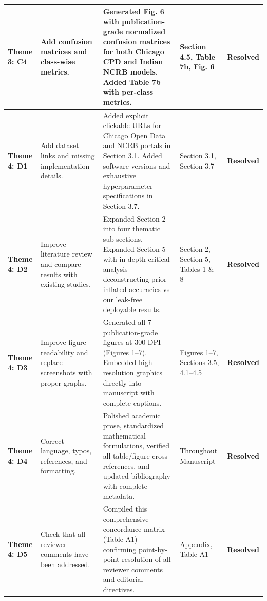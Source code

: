 \documentclass[runningheads]{llncs}
\begin{document}
\begin{table}[ht]
{\begin{tabular}{lp{4.5cm}p{5.5cm}p{3cm}c}
\textbf{Theme 3: C4} & Add confusion matrices and class-wise metrics. & Generated Fig. 6 with publication-grade normalized confusion matrices for both Chicago CPD and Indian NCRB models. Added Table 7b with per-class metrics. & Section 4.5, Table 7b, Fig. 6 & \textbf{Resolved} \\
\midrule
\textbf{Theme 4: D1} & Add dataset links and missing implementation details. & Added explicit clickable URLs for Chicago Open Data and NCRB portals in Section 3.1. Added software versions and exhaustive hyperparameter specifications in Section 3.7. & Section 3.1, Section 3.7 & \textbf{Resolved} \\
\textbf{Theme 4: D2} & Improve literature review and compare results with existing studies. & Expanded Section 2 into four thematic sub-sections. Expanded Section 5 with in-depth critical analysis deconstructing prior inflated accuracies vs our leak-free deployable results. & Section 2, Section 5, Tables 1 \& 8 & \textbf{Resolved} \\
\textbf{Theme 4: D3} & Improve figure readability and replace screenshots with proper graphs. & Generated all 7 publication-grade figures at 300 DPI (Figures 1--7). Embedded high-resolution graphics directly into manuscript with complete captions. & Figures 1--7, Sections 3.5, 4.1--4.5 & \textbf{Resolved} \\
\textbf{Theme 4: D4} & Correct language, typos, references, and formatting. & Polished academic prose, standardized mathematical formulations, verified all table/figure cross-references, and updated bibliography with complete metadata. & Throughout Manuscript & \textbf{Resolved} \\
\textbf{Theme 4: D5} & Check that all reviewer comments have been addressed. & Compiled this comprehensive concordance matrix (Table A1) confirming point-by-point resolution of all reviewer comments and editorial directives. & Appendix, Table A1 & \textbf{Resolved} \\
\bottomrule
\end{tabular}
}
\end{table}
\end{document}

